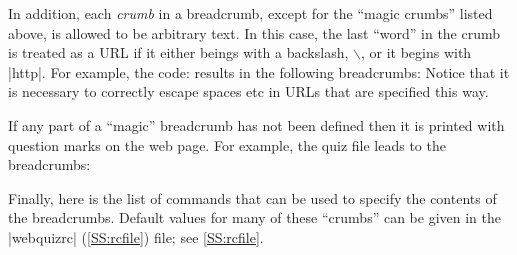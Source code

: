 \documentclass[svgnames]{article}
\newcommand\webquizrc{\index{webquizrc}%
  \BashCode|webquizrc| (\autoref{SS:rcfile})\xspace%
}
\begin{document}
    \noindent
    In addition, each \textit{crumb} in a breadcrumb, except for the
    ``magic crumbs'' listed above, is allowed to be arbitrary text. In
    this case, the last ``word'' in the crumb is treated as a URL if it
    either beings with a backslash, $\backslash$, or it begins with
    \BashCode|http|.  For example, the code:
    \noindent
    results in the following breadcrumbs:
    Notice that it is necessary to correctly escape spaces etc in
    URLs that are specified this way.

    If any part of a ``magic'' breadcrumb has not been defined then it
    is printed with question marks on the web page. For example, the quiz
    file
    leads to the breadcrumbs:

    Finally, here is the list of \WebQuiz commands that can be used to
    specify the contents of the breadcrumbs. Default values for many of these
    ``crumbs'' can be given in the \webquizrc file; see \autoref{SS:rcfile}.
\end{document}
